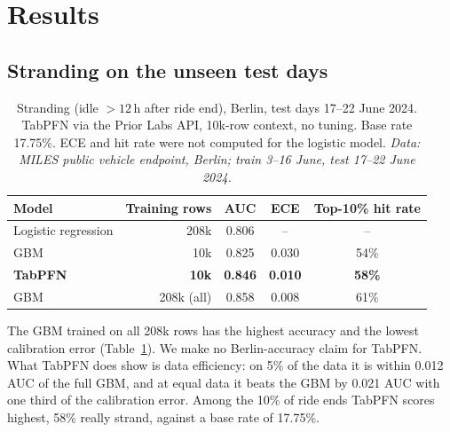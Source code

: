 \documentclass[11pt,a4paper]{article}
\begin{document}
\section{Results}\label{sec:results}

\subsection{Stranding on the unseen test days}

\begin{table}[h]
\centering
\caption{Stranding (idle $>12$\,h after ride end), Berlin, test days 17--22 June 2024. TabPFN via the Prior Labs API, 10k-row context, no tuning. Base rate 17.75\%. ECE and hit rate were not computed for the logistic model. \emph{Data: MILES public vehicle endpoint, Berlin; train 3--16 June, test 17--22 June 2024.}}
\label{tab:strand}
\begin{tabular}{lrccc}
\toprule
Model & Training rows & AUC & ECE & Top-10\% hit rate \\
\midrule
Logistic regression & 208k & 0.806 & -- & -- \\
GBM & 10k & 0.825 & 0.030 & 54\% \\
\textbf{TabPFN} & \textbf{10k} & \textbf{0.846} & \textbf{0.010} & \textbf{58\%} \\
GBM & 208k (all) & 0.858 & 0.008 & 61\% \\
\bottomrule
\end{tabular}
\end{table}

The GBM trained on all 208k rows has the highest accuracy and the lowest calibration error (Table~\ref{tab:strand}). We make no Berlin-accuracy claim for TabPFN. What TabPFN does show is data efficiency: on 5\% of the data it is within 0.012 AUC of the full GBM, and at equal data it beats the GBM by 0.021 AUC with one third of the calibration error. Among the 10\% of ride ends TabPFN scores highest, 58\% really strand, against a base rate of 17.75\%.
\end{document}
